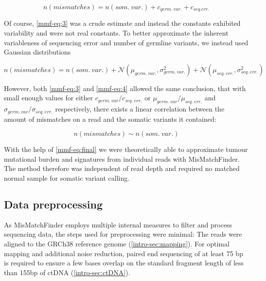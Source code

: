 \begin{equation}
n(mismatches) = n(som.~var.) + c_{germ.~var.} + c_{seq. err.}
\label{mmf-eq:3}
\end{equation}\myequation[\ref{mmf-eq:3}]{MisMatchFinder: germline variants}

Of course, \autoref{mmf-eq:3} was a crude estimate and instead the constants exhibited variability and were not real constants. To better approximate the inherent variableness of sequencing error and number of germline variants, we instead used Gaussian distributions 

\begin{equation}
n(mismatches) = n(som.~var.) + \mathcal{N}(\mu_{germ.~var.}, \sigma_{germ.~var.}^{2}) + \mathcal{N}(\mu_{seq.~err.}, \sigma_{seq.~err.}^{2})
\label{mmf-eq:4}
\end{equation}
\myequation[\ref{mmf-eq:4}]{MisMatchFinder: number of mismatches with distributions}

However, both \autoref{mmf-eq:3} and \ref{mmf-eq:4} allowed the same conclusion, that with small enough values for either $c_{germ.~var}/c_{seq.~err.}$ or $\mu_{germ.~var}/\mu_{seq.~err.}$ and $\sigma_{germ.~var}/\sigma_{seq.~err.}$ respectively, there exists a linear correlation between the amount of mismatches on a read and the somatic variants it contained:

\begin{equation}
n(mismatches) \sim n(som.~var.)
\label{mmf-eq:final}
\end{equation}
\myequation[\ref{mmf-eq:final}]{MisMatchFinder: number of mismatches correlation with somatic variants}

With the help of \autoref{mmf-eq:final} we were theoretically able to approximate tumour mutational burden and signatures from individual reads with MisMatchFinder. The method therefore was independent of read depth and required no matched normal sample for somatic variant calling.

\subsection{Data preprocessing}
As MisMatchFinder employs multiple internal measures to filter and process sequencing data, the steps used for preprocessing were minimal: The reads were  aligned to the GRCh38 reference genome (\autoref{intro-sec:mapping}). For optimal mapping and additional noise reduction, paired end sequencing of at least 75 bp is required to ensure a few bases overlap on the standard fragment length of less than 155bp of ctDNA (\autoref{intro-sec:ctDNA}). 

